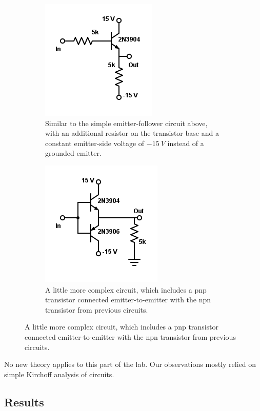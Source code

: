 \documentclass[11pt]{article}
\begin{document}
\begin{figure}[H]
    \centering
    \begin{subfigure}{0.4\textwidth}
        \centering
        \includegraphics[scale=0.6]{Diagrams/c-2bL.png}
        \caption{Similar to the simple emitter-follower circuit above, with an additional resistor on the transistor base and a constant emitter-side voltage of $-15\ V$ instead of a grounded emitter.}
        \label{circuit:2bL}
    \end{subfigure}
    \begin{subfigure}{0.4\textwidth}
        \centering
        \includegraphics[scale=0.6]{Diagrams/c-2bR.png}
        \caption{A little more complex circuit, which includes a pnp transistor connected emitter-to-emitter with the npn transistor from previous circuits.}
        \label{circuit:2bR}
    \end{subfigure}
\end{figure}

No new theory applies to this part of the lab. Our observations mostly relied on simple Kirchoff analysis of circuits.\\

\subsection{Results}
\end{document}
